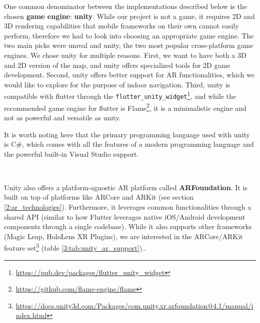         One common denominator between the implementations described below is the chosen \textbf{game engine}: \textbf{\gls{unity}}. While our project is not a game, it requires 2D and 3D rendering capabilities that mobile frameworks on their own cannot easily perform, therefore we had to look into choosing an appropriate game engine. The two main picks were \gls{unreal} and \gls{unity}, the two most popular cross-platform game engines. We chose \gls{unity} for multiple reasons. First, we want to have both a 3D and 2D version of the map, and \gls{unity} offers specialized tools for 2D game development. Second, \gls{unity} offers better support for AR functionalities, which we would like to explore for the purpose of indoor navigation. Third, \gls{unity} is compatible with \gls{flutter} through the \texttt{flutter_unity_widget}\footnote{\url{https://pub.dev/packages/flutter_unity_widget}}, and while the recommended game engine for \gls{flutter} is Flame\footnote{\url{https://github.com/flame-engine/flame}}, it is a minimalistic engine and not as powerful and versatile as \gls{unity}.
        
        It is worth noting here that the primary programming language used with \gls{unity} is C\#, which comes with all the features of a modern programming language and the powerful built-in Visual Studio support.
        
        ~
        
        Unity also offers a platform-agnostic AR platform called \textbf{ARFoundation}. It is built on top of platforms like ARCore and ARKit (see section \ref{2:ar_technologies}). Furthermore, it leverages common functionalities through a shared API (similar to how Flutter leverages native iOS/Android development components through a single codebase). While it also supports other frameworks (Magic Leap, HoloLens XR Plugins), we are interested in the ARCore/ARKit feature set\footnote{\url{https://docs.unity3d.com/Packages/com.unity.xr.arfoundation@4.1/manual/index.html}} (table \ref{3:tab:unity_ar_support})..
        
